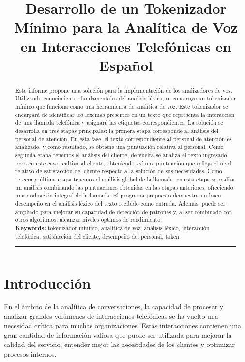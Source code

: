 \documentclass[10pt,times,twocolumn]{article}
\title{Desarrollo de un Tokenizador Mínimo para la Analítica de Voz en Interacciones Telefónicas en Español}
\author
{
	\anonymize{Elías Cristaldo}\inst{1} 	
}
\begin{document}
\maketitle

\begin{abstract}
Este informe propone una solución para la implementación de los analizadores de voz. Utilizando conocimientos fundamentales del análisis léxico, se construye un tokenizador mínimo que funciona como una herramienta de analítica de voz. Este tokenizador se encargará de identificar los lexemas presentes en un texto que representa la interacción de una llamada telefónica y asignará las etiquetas correspondientes. La solución se desarrolla en tres etapas principales: la primera etapa corresponde al análisis del personal de atención. En esta fase, el texto correspondiente al personal de atención es analizado, y como resultado, se obtiene una puntuación relativa al personal. Como segunda etapa tenemos el análisis del cliente, de vuelta se analiza el texto ingresado, pero en este caso realtiva al cliente, obteniendo así una puntuación que refleja el nivel relativo de satisfacción del cliente respecto a la solución de sus necesidades. Como tercera y última etapa tenemos el análisis global de la llamada, en esta etapa se realiza un análisis combinando las puntuaciones obtenidas en las etapas anteriores, ofreciendo una evaluación integral de la llamada. El programa propuesto demuestra un buen desempeño en el análisis léxico del texto recibido como entrada. Además, puede ser ampliado para mejorar su capacidad de detección de patrones y, al ser combinado con otros algoritmos, alcanzar niveles óptimos de rendimiento.\\

{\bf Keywords:} tokenizador mínimo, analítica de voz, análisis léxico, interacción telefónica, satisfacción del cliente, desempeño del personal, token.\\
\rule{\linewidth}{0.5pt}

\end{abstract}

\section{Introducción}
En el ámbito de la analítica de conversaciones, la capacidad de procesar y analizar grandes volúmenes de interacciones telefónicas se ha vuelto una necesidad crítica para muchas organizaciones. Estas interacciones contienen una gran cantidad de información valiosa que puede ser utilizada para mejorar la calidad del servicio, entender mejor las necesidades de los clientes y optimizar procesos internos. 
\end{document}
